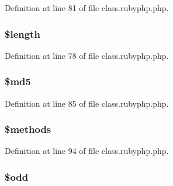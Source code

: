 Definition at line 81 of file class.\-rubyphp.\-php.

\hypertarget{class_pierce_moore_1_1_ruby_p_h_p_1_1r_adf14d8e29912c1855022dfa252aa4087}{
\subsubsection[{\$length}]{\setlength{\rightskip}{0pt plus 5cm}\${\bf length}}}\label{class_pierce_moore_1_1_ruby_p_h_p_1_1r_adf14d8e29912c1855022dfa252aa4087}


Definition at line 78 of file class.\-rubyphp.\-php.

\hypertarget{class_pierce_moore_1_1_ruby_p_h_p_1_1r_a2557b214f57a046187b88572e443da1f}{
\subsubsection[{\$md5}]{\setlength{\rightskip}{0pt plus 5cm}\${\bf md5}}}\label{class_pierce_moore_1_1_ruby_p_h_p_1_1r_a2557b214f57a046187b88572e443da1f}


Definition at line 85 of file class.\-rubyphp.\-php.

\hypertarget{class_pierce_moore_1_1_ruby_p_h_p_1_1r_a802753499268a04da139bd6e6ef89b35}{
\subsubsection[{\$methods}]{\setlength{\rightskip}{0pt plus 5cm}\$methods}}\label{class_pierce_moore_1_1_ruby_p_h_p_1_1r_a802753499268a04da139bd6e6ef89b35}


Definition at line 94 of file class.\-rubyphp.\-php.

\hypertarget{class_pierce_moore_1_1_ruby_p_h_p_1_1r_aee2d4fa4e98da4e6ad23bee644ab5e7a}{
\subsubsection[{\$odd}]{\setlength{\rightskip}{0pt plus 5cm}\$odd}}\label{class_pierce_moore_1_1_ruby_p_h_p_1_1r_aee2d4fa4e98da4e6ad23bee644ab5e7a}


